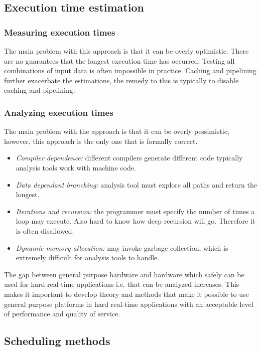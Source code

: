\documentclass[a4paper]{article}
\begin{document}
\subsection{Execution time estimation}

\subsubsection{Measuring execution times}
The main problem with this approach is that it can be overly optimistic.
There are no guarantees that the longest execution time has occurred.
Testing all combinations of input data is often impossible in practice.
Caching and pipelining further exacerbate the estimations, the remedy to this
is typically to disable caching and pipelining.

\subsubsection{Analyzing execution times}
The main problem with the approach is that it can be overly pessimistic, however,
this approach  is the only one that is formally correct.

\begin{itemize}
  \item \emph{Compiler dependence:} different compilers generate different code
        typically analysis tools work with machine code.
  \item \emph{Data dependant branching:} analysis tool must explore all paths
        and return the longest.
  \item \emph{Iterations and recursion:} the programmer must specify the number
        of times a loop may execute. Also hard to know how deep recursion will
        go. Therefore it is often disallowed.
  \item \emph{Dynamic memory allocation:} may invoke garbage collection, which
        is extremely difficult for analysis tools to handle.
\end{itemize}

The gap between general purpose hardware and hardware which safely can be used
for hard real-time applications i.e. that can be analyzed increases. This makes
it important to develop theory and methods that make it possible to use general
purpose platforms in hard real-time applications with an acceptable level of
performance and quality of service.

\subsection{Scheduling methods}
\end{document}
